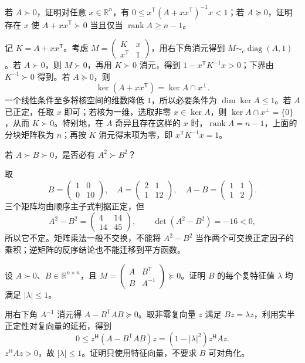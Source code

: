 \begin{example}
若 $A\succ0$，证明对任意 $x\in\mathbb R^n$，有 $0\le x^{\mathsf T}(A+xx^{\mathsf T})^{-1}x<1$；若 $A\succeq0$，证明存在 $x$ 使 $A+xx^{\mathsf T}\succ0$ 当且仅当 $\operatorname{rank}A\ge n-1$。
\end{example}
\begin{solve}
记 $K=A+xx^{\mathsf T}$。考虑 $M=\begin{pmatrix}K&x\\x^{\mathsf T}&1\end{pmatrix}$，用右下角消元得到 $M\sim_{\mathrm c}\operatorname{diag}(A,1)$。若 $A\succ0$，则 $M\succ0$，再用 $K\succ0$ 消元，得到 $1-x^{\mathsf T}K^{-1}x>0$；下界由 $K^{-1}\succ0$ 得到。若 $A\succeq0$，则
\[
 \ker(A+xx^{\mathsf T})=\ker A\cap x^\perp.
\]
一个线性条件至多将核空间的维数降低 $1$，所以必要条件为 $\dim\ker A\le1$。若 $A$ 已正定，任取 $x$ 即可；若核为一维，选取非零 $x\in\ker A$，则 $\ker A\cap x^\perp=\{0\}$，从而 $K\succ0$。特别地，在 $A$ 奇异且存在这样的 $x$ 时，$\operatorname{rank}A=n-1$，上面的分块矩阵秩为 $n$；再按 $K$ 消元得末项为零，即 $x^{\mathsf T}K^{-1}x=1$。
\end{solve}

\begin{example}
若 $A\succ B\succ0$，是否必有 $A^2\succ B^2$？
\end{example}
\begin{solve}
取
\[
 B=\begin{pmatrix}1&0\\0&10\end{pmatrix},\quad
 A=\begin{pmatrix}2&1\\1&12\end{pmatrix},\quad
 A-B=\begin{pmatrix}1&1\\1&2\end{pmatrix}.
\]
三个矩阵均由顺序主子式判据正定，但
\[
 A^2-B^2=\begin{pmatrix}4&14\\14&45\end{pmatrix},\qquad
 \det(A^2-B^2)=-16<0,
\]
所以它不定。矩阵乘法一般不交换，不能将 $A^2-B^2$ 当作两个可交换正定因子的乘积；逆矩阵的反序结论也不能迁移到平方函数。
\end{solve}

\begin{example}
设 $A\succ0$、$B\in\mathbb R^{n\times n}$，且 $M=\begin{pmatrix}A&B^{\mathsf T}\\B&A^{-1}\end{pmatrix}\succeq0$。证明 $B$ 的每个复特征值 $\lambda$ 均满足 $|\lambda|\le1$。
\end{example}
\begin{solve}
用右下角 $A^{-1}$ 消元得 $A-B^{\mathsf T}AB\succeq0$。取非零复向量 $z$ 满足 $Bz=\lambda z$，利用实半正定性对复向量的延拓，得到
\[
 0\le z^{\mathsf H}(A-B^{\mathsf T}AB)z
 =(1-|\lambda|^2)z^{\mathsf H}Az.
\]
$z^{\mathsf H}Az>0$，故 $|\lambda|\le1$。证明只使用特征向量，不要求 $B$ 可对角化。
\end{solve}

